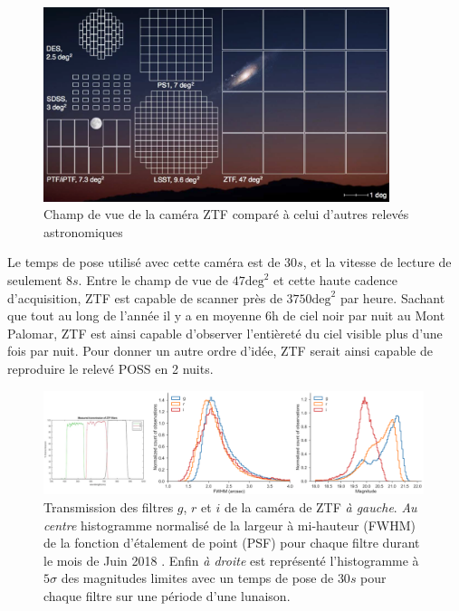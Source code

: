 \documentclass[../main/main.tex]{subfiles}
\begin{document}
\begin{figure}[h]
\centering
\includegraphics[width=0.9\textwidth]{../figures/02_ztf/ztfcamerafov.png}
\caption{Champ de vue de la caméra ZTF comparé à celui d'autres relevés astronomiques }
\label{fig:ztfcamerafov}
\end{figure}


Le temps de pose utilisé avec cette caméra est de $30s$, et la vitesse
de lecture de seulement $8s$. Entre le champ de vue de
$47\text{deg}^{2}$ et cette haute cadence d'acquisition, ZTF est capable
de scanner près de $3750\text{deg}^{2}$ par heure. Sachant que tout au long
de l'année il y a en moyenne 6h de ciel noir par nuit au Mont Palomar, ZTF est ainsi
capable d'observer l'entièreté du ciel visible plus d'une fois par
nuit. Pour donner un autre
ordre d'idée, ZTF serait ainsi capable de reproduire le relevé POSS
\citep{MinkowskiPOSS} en 2 nuits.

\begin{figure}[h]
  \centering
  \includegraphics[width=0.99\textwidth]{../figures/02_ztf/ztfperformances.png}
  \caption[Filtres et performances associées de la caméra
  ZTF]{Transmission des filtres $g$, $r$ et $i$ de la caméra de ZTF
    \citep{DekanyZTF2020} \textit{à gauche}. \textit{Au centre} histogramme
    normalisé de la largeur à mi-hauteur (FWHM) de la fonction
    d'étalement de point (PSF) pour chaque filtre durant le mois de Juin
    2018 \citep{BellmZTF2019}. Enfin \textit{à droite} est représenté
    l'histogramme à $5\sigma$ des magnitudes limites avec un temps de
    pose de $30s$ pour chaque filtre sur une période d'une lunaison.}
  \label{fig:ztfperffilts}
\end{figure}
\end{document}
